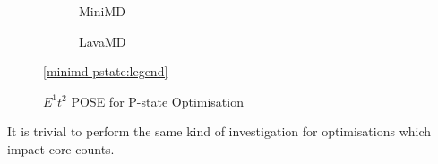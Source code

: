\begin{figure}[t]%
\begin{subfigure}[t]{.5\linewidth}%
\centering%
%
\caption{MiniMD}%
\end{subfigure}%
\begin{subfigure}[t]{.5\linewidth}%
%
\caption{LavaMD}%
\end{subfigure}%
\begin{center}%
\ref{minimd-pstate:legend}%
\end{center}%
\caption{$E^1t^2$ POSE for P-state Optimisation}%
\label{fig:pstates}%
\end{figure}%

It is trivial to perform the same kind of investigation for optimisations which impact core counts.


